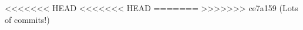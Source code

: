 \documentclass{../../oss-apphys-exam}
\begin{document}
\begin{multicols*}{2}
\begin{questions}
{{%
%
%    
<<<<<<< HEAD
<<<<<<< HEAD
=======
>>>>>>> ce7a159 (Lots of commits!)
    
}}
\end{questions}
\end{multicols*}
\end{document}

